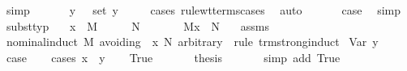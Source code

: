\begin{isabellebody}
\ simp\isanewline
\ \ \isamarkupfalse%
\ {}{\isacharparenleft}{}{\isacharparenright}\ \isamarkupfalse%
\ {\isachardoublequoteopen}{\isacharparenleft}y{\isacharcomma}\ {\isasymsigma}{\isacharparenright}\ {\isasymin}\ set\ {\isacharparenleft}{\isacharparenleft}y{\isacharcomma}\ {\isasymtau}{\isacharparenright}\ {\isacharhash}\ {\isasymGamma}{\isacharparenright}{\isachardoublequoteclose}\ \isamarkupfalse%
\ {\isacharparenleft}cases\ rule{\isacharcolon}wt{\isacharunderscore}terms{\isachardot}cases{\isacharparenright}\ \isamarkupfalse%
\ auto\isanewline
\ \ \isamarkupfalse%
\ {}\ \isamarkupfalse%
\ {\isacharquery}case\ \isamarkupfalse%
\ simp\isanewline
{}\isamarkupfalse%
%
\endisatagproof
{\isafoldproof}%
%
\isadelimproof
\isanewline
%
\endisadelimproof
\isanewline
{}\isamarkupfalse%
\ subst{\isacharunderscore}typ{\isacharcolon}\isanewline
\ \ \ {\isachardoublequoteopen}{\isacharparenleft}{\isacharparenleft}x{\isacharcomma}{\isasymtau}{\isacharparenright}{\isacharhash}{\isasymGamma}{\isacharparenright}\ {\isasymturnstile}\ M\ {\isacharcolon}\ {\isasymsigma}{\isachardoublequoteclose}\ \ {\isachardoublequoteopen}{\isasymGamma}\ {\isasymturnstile}\ N\ {\isacharcolon}\ {\isasymtau}{\isachardoublequoteclose}\isanewline
\ \ \ {\isachardoublequoteopen}{\isasymGamma}\ {\isasymturnstile}\ M{\isacharbrackleft}x\ {\isacharcolon}{\isacharcolon}{\isacharequal}\ N{\isacharbrackright}\ {\isacharcolon}\ {\isasymsigma}{\isachardoublequoteclose}\isanewline
%
\isadelimproof
%
\endisadelimproof
%
\isatagproof
{}\isamarkupfalse%
\ assms\ \isamarkupfalse%
\ {\isacharparenleft}nominal{\isacharunderscore}induct\ M\ avoiding{\isacharcolon}\ {\isasymGamma}\ x\ N\ arbitrary{\isacharcolon}\ {\isasymsigma}\ rule{\isacharcolon}\ trm{\isachardot}strong{\isacharunderscore}induct{\isacharparenright}\isanewline
{}\isamarkupfalse%
\ {\isacharparenleft}Var\ y{\isacharparenright}\isanewline
\ \ \isamarkupfalse%
\ {\isacharquery}case\isanewline
\ \ \isamarkupfalse%
\ {\isacharparenleft}cases\ {\isachardoublequoteopen}x\ {\isacharequal}\ y{\isachardoublequoteclose}{\isacharparenright}\isanewline
\ \ \isamarkupfalse%
\ True\ \isanewline
\ \ \ \ \isamarkupfalse%
\ {\isacharquery}thesis\ \isanewline
\ \ \ \ \isamarkupfalse%
\ {\isacharparenleft}simp\ add{\isacharcolon}\ True{\isacharparenright}\isanewline

\end{isabellebody}
